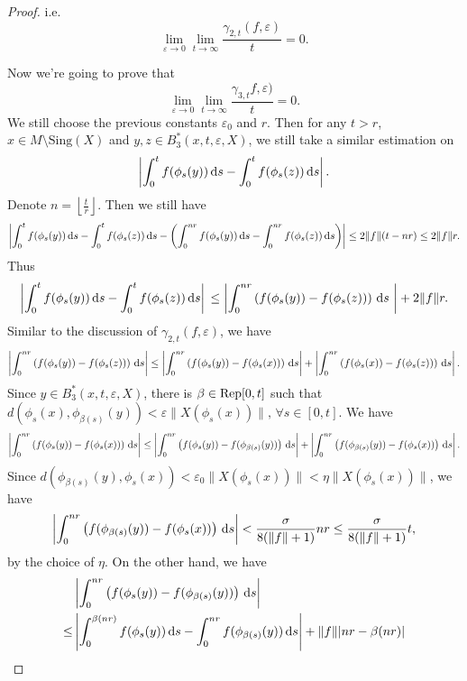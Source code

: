 \documentclass[10pt]{article}
\newtheorem*{Theorem A}{Theorem A}
\begin{document}
\begin{proof}
\noindent
i.e.
\[
\lim\limits_{\varepsilon \to 0} \lim_{t \to \infty} \frac{\gamma_{2,t}(f,\varepsilon)}{t} = 0.
\]

Now we're going to prove that
\[
\lim\limits_{\varepsilon \to 0} \lim\limits_{t \to \infty} \frac{\gamma_{3,t}f, \varepsilon)}{t} = 0.
\]
We still choose the previous constants \( \varepsilon_0 \) and \( r \).
Then for any \( t > r \),  \( x \in M \setminus \text{Sing}(X) \) and
\( y, z \in B_3^*(x, t, \varepsilon, X) \), we still take a similar estimation on
\[
\left| \int_0^t f(\phi_s(y)) \, {\rm d}s - \int_0^t f(\phi_s(z)) \, {\rm d}s \right|.
\]
Denote \( n = \left\lfloor \frac{t}{r} \right\rfloor \). Then we still have
\[
\left| \int_0^t f(\phi_s(y)) \, {\rm d}s - \int_0^t f(\phi_s(z)) \, {\rm d}s - \left( \int_0^{nr} f(\phi_s(y)) \, {\rm d}s - \int_0^{nr} f(\phi_s(z)) \, {\rm d}s \right) \right| \leq 2 \| f \| (t - nr) \leq 2 \| f \| r.
\]
Thus
\[
\left| \int_0^t f(\phi_s(y)) \, {\rm d}s - \int_0^t f(\phi_s(z)) \, {\rm d}s \right| \\
\leq \left|   \int_0^{nr} \left(f(\phi_s(y))-f(\phi_s(z))\right) \, {\rm d}s \ \right| + 2 \| f \|  r.
\]
Similar to the discussion of \( \gamma_{2,t}(f, \varepsilon) \), we have
\[\left| \int_0^{nr} \left(f(\phi_s(y)) -f(\phi_s(z)) \right)\, {\rm d}s \right|\leq \left| \int_0^{nr}\left( f(\phi_s(y)) -f(\phi_s(x)) \right)\, {\rm d}s \right| + \left| \int_0^{nr}\left( f(\phi_s(x))-f(\phi_s(z))\right) \, {\rm d}s \right|.
\]
Since $y\in B_3^*(x, t, \varepsilon, X)$, there is $\beta\in {\rm Rep}[0, t]$ such that $d(\phi_s(x), \phi_{\beta(s)}(y))<\varepsilon\|X(\phi_s(x))\|,\, \forall s\in[0,t]$.  We have
\[
\left| \int_0^{nr} \left(f(\phi_s(y))-f(\phi_s(x))\right) \, {\rm d}s \right| \leq \left| \int_0^{nr} \left(f(\phi_s(y)) -f(\phi_{\beta(s)}(y))\right) \, {\rm d}s \right| + \left| \int_0^{nr} \left(f(\phi_{\beta(s)}(y))-f(\phi_s(x))\right) \, {\rm d}s \right|.
\]
Since $d(\phi_{\beta(s)}(y), \phi_s(x))<\varepsilon_0\|X(\phi_s(x))\|<\eta\|X(\phi_s(x))\|$, we have
\[
\left| \int_0^{nr} \left(f(\phi_{\beta(s)}(y))-f(\phi_s(x))\right) \, {\rm d}s \right| < \frac{\sigma}{8(\| f \| + 1)} nr \leq \frac{\sigma}{8(\| f \| + 1)}  t,
\]
by the choice of $\eta$. On the other hand, we have
\begin{align*}
    &\left| \int_0^{nr} \left(f(\phi_s(y))-f(\phi_{\beta(s)}(y))\right) \, {\rm d}s \right| \\
\leq &\left| \int_0^{\beta(nr)} f(\phi_s(y)) \, {\rm d}s - \int_0^{nr} f(\phi_{\beta(s)}(y)) \, {\rm d}s \right| + \| f \|  |nr - \beta(nr)| \\

\end{align*}
\end{proof}
\end{document}
